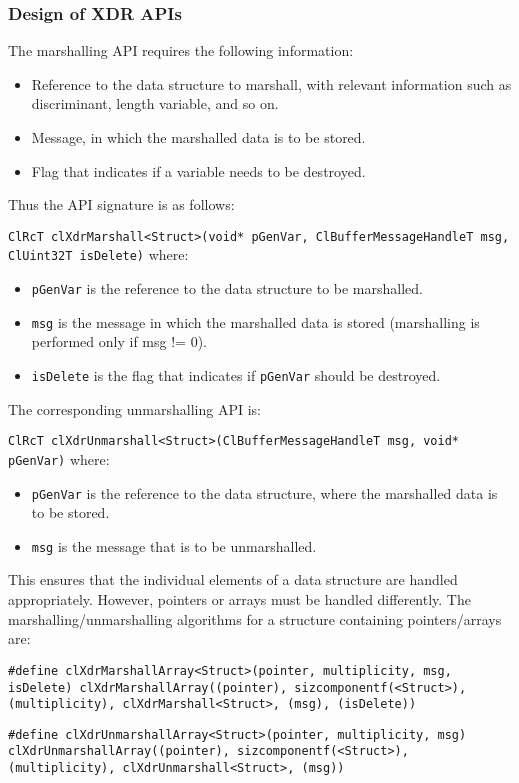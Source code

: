 \begin{flushleft}
\subsubsection{Design of XDR APIs}
The marshalling API requires the following information:
\begin{itemize}
\item
Reference to the data structure to marshall, with relevant information such as discriminant, length variable, and so on.
\item
Message, in which the marshalled data is to be stored.
\item
Flag that indicates if a variable needs to be destroyed.
\end{itemize}
Thus the API signature is as follows:
\par
{\tt{ClRcT clXdrMarshall<Struct>(void* pGenVar, ClBufferMessageHandleT msg, ClUint32T isDelete)}}
where:
\begin{itemize}
\item
{\tt{pGenVar}} is the reference to the data structure to be marshalled.
\item
{\tt{msg}} is the message in which the marshalled data is stored (marshalling is performed only if msg != 0).
\item
{\tt{isDelete}} is the flag that indicates if {\tt{pGenVar}} should be destroyed.
\end{itemize}

The corresponding unmarshalling API is:\par
{\tt{ClRcT clXdrUnmarshall<Struct>(ClBufferMessageHandleT msg, void* pGenVar)}}
where:
\begin{itemize}
\item
{\tt{pGenVar}} is the reference to the data structure, where the marshalled data is to be stored.
\item
{\tt{msg}} is the message that is to be unmarshalled. 
\end{itemize}
This ensures that the individual elements of a data structure are handled appropriately. However, pointers or arrays must be handled differently. 
The marshalling/unmarshalling algorithms for a structure containing pointers/arrays are:\par
{\tt{\#define clXdrMarshallArray<Struct>(pointer, multiplicity, msg, isDelete) clXdrMarshallArray((pointer), sizcomponentf(<Struct>), (multiplicity), 
clXdrMarshall<Struct>, (msg), (isDelete))}}\par

{\tt{\#define clXdrUnmarshallArray<Struct>(pointer, multiplicity, msg) clXdrUnmarshallArray((pointer), sizcomponentf(<Struct>), (multiplicity), 
clXdrUnmarshall<Struct>, (msg))}}\par


\end{flushleft}
